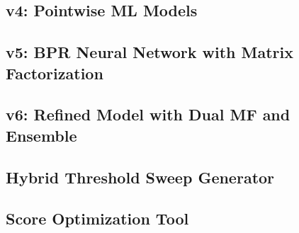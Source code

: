 \documentclass[12pt]{article}
\begin{document}
\newpage
\subsection{v4: Pointwise ML Models}



\newpage
\subsection{v5: BPR Neural Network with Matrix Factorization}



\newpage
\subsection{v6: Refined Model with Dual MF and Ensemble}



\newpage
\subsection{Hybrid Threshold Sweep Generator}



\newpage
\subsection{Score Optimization Tool}


\end{document}
